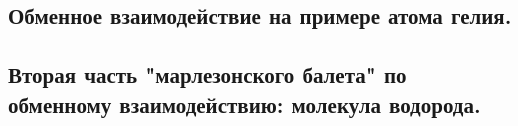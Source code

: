 
\tableofcontents



\subsection*{Обменное взаимодействие на примере атома гелия.}


\subsection*{Вторая часть "марлезонского балета" по обменному взаимодействию: молекула водорода.}
